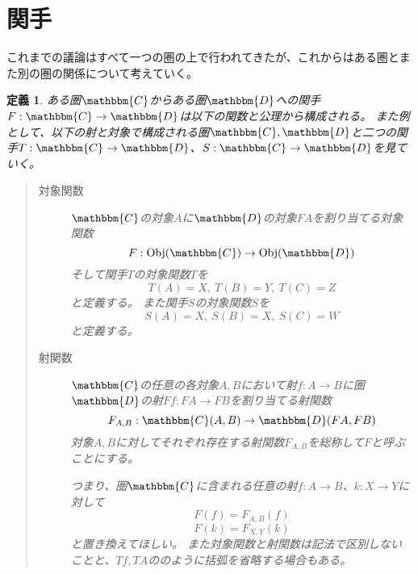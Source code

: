 \documentclass[dvipdfmx]{jsarticle}
\newcommand{\cat}[1]{\mathbbm{#1}}
\newcommand{\arrow}{\rightarrow}
\newcommand{\functor}[3]{#1:\cat{#2}\arrow \cat{#3}}
\newcommand{\obj}[1]{\mathrm{Obj}(\cat{#1})}
\newcommand{\mor}[3]{#1:#2\arrow #3}
\newcommand{\arset}[3]{\cat{#1}(#2,#3)}
\newtheorem{define}{定義}[section]
\numberwithin{proof}{subsection}
\numberwithin{prop}{subsection}
\numberwithin{define}{subsection}
\begin{document}
	\section{関手}
	これまでの議論はすべて一つの圏の上で行われてきたが、これからはある圏とまた別の圏の関係について考えていく。
	\begin{define}
		ある圏$\cat{C}$からある圏$\cat{D}$への関手$\functor{F}{C}{D}$は以下の関数と公理から構成される。
		また例として、以下の射と対象で構成される圏$\cat{C},\cat{D}$と二つの関手$\functor{T}{C}{D}$、$\functor{S}{C}{D}$を見ていく。
		\begin{center}
		\end{center}
		\begin{quote}
			\begin{description}
		\item[対象関数]$\cat{C}$の対象$A$に$\cat{D}$の対象$FA$を割り当てる対象関数\[\mor{F}{\obj{C}}{\obj{D}}\]
		そして関手$T$の対象関数$T$を\[T(A)=X,\ T(B)=Y,\ T(C)=Z\]と定義する。
		また関手$S$の対象関数$S$を\[S(A)=X,\ S(B)=X,\ S(C)=W\]と定義する。
		\item[射関数]$\cat{C}$の任意の各対象$A,B$において射$\mor{f}{A}{B}$に圏$\cat{D}$の射$\mor{Ff}{FA}{FB}$を割り当てる射関数\[\mor{F_{A,B}}{\arset{C}{A}{B}}{\arset{D}{FA}{FB}}\]対象$A,B$に対してそれぞれ存在する射関数$F_{A,B}$を総称して$F$と呼ぶことにする。

		つまり、圏$\cat{C}$に含まれる任意の射$\mor{f}{A}{B}$、$\mor{k}{X}{Y}$に対して\[F(f)=F_{A,B}(f)\]\[F(k)=F_{X,Y}(k)\]と置き換えてほしい。
		また対象関数と射関数は記法で区別しないことと、$Tf,TA$ののように括弧を省略する場合もある。


\end{description}
\end{quote}
\end{define}
\end{document}
